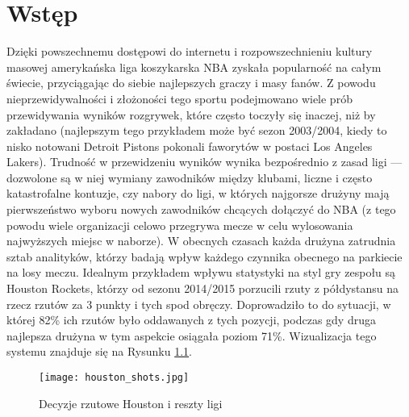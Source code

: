 \documentclass[inzynierska]{pwr_wmat_praca_dyplomowa}
\theoremstyle{plain}
\numberwithin{theorem}{chapter}
\theoremstyle{definition}
\numberwithin{theorem}{chapter}
\begin{document}
\frontmatter
\maketitle
\mainmatter
\tableofcontents

{\backmatter \chapter{Wstęp}}
Dzięki powszechnemu dostępowi do internetu i rozpowszechnieniu kultury masowej amerykańska liga koszykarska NBA zyskała popularność na całym świecie, przyciągając do siebie najlepszych graczy i masy fanów. Z powodu nieprzewidywalności i złożoności tego sportu podejmowano wiele prób przewidywania wyników rozgrywek, które często toczyły się inaczej, niż by zakładano (najlepszym tego przykładem może być sezon 2003/2004, kiedy to nisko notowani Detroit Pistons pokonali faworytów w postaci Los Angeles Lakers). Trudność w przewidzeniu wyników wynika bezpośrednio z zasad ligi --- dozwolone są w niej wymiany zawodników między klubami, liczne i często katastrofalne kontuzje, czy nabory do ligi, w których najgorsze drużyny mają pierwszeństwo wyboru nowych zawodników chcących dołączyć do NBA (z tego powodu wiele organizacji celowo przegrywa mecze w celu wylosowania najwyższych miejsc w naborze). W obecnych czasach każda drużyna zatrudnia sztab analityków, którzy badają wpływ każdego czynnika obecnego na parkiecie na losy meczu. Idealnym przykładem wpływu statystyki na styl gry zespołu są Houston Rockets, którzy od sezonu 2014/2015 porzucili rzuty z półdystansu na rzecz rzutów za 3 punkty i tych spod obręczy. Doprowadziło to do sytuacji, w której 82\% ich rzutów było oddawanych z tych pozycji, podczas gdy druga najlepsza drużyna w tym aspekcie osiągała poziom 71\%. Wizualizacja tego systemu znajduje się na Rysunku \ref{houston_shots}.
\begin{figure}[h]
	\hspace*{-1cm}
	\texttt{[image: houston\_shots.jpg]}
	\caption{Decyzje rzutowe Houston i reszty ligi}\label{houston_shots}
	\centering
\end{figure}
\end{document}
